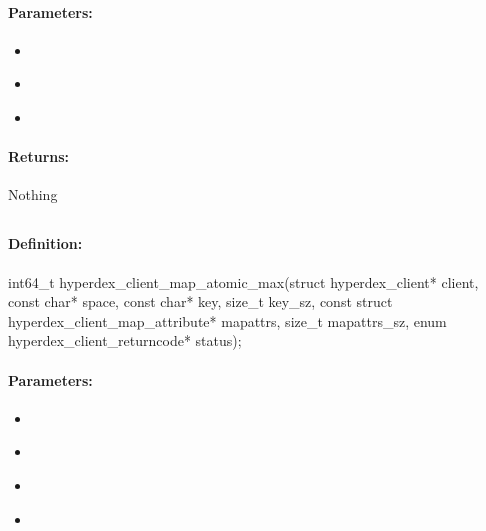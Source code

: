 \paragraph{Parameters:}
\begin{itemize}[noitemsep]
\item {}\\

\item {}\\

\item {}\\

\end{itemize}

\paragraph{Returns:}
Nothing
\pagebreak
\subsection{}
\label{api:c:map_atomic_max}


\paragraph{Definition:}
\begin{ccode}
int64_t hyperdex_client_map_atomic_max(struct hyperdex_client* client,
        const char* space,
        const char* key, size_t key_sz,
        const struct hyperdex_client_map_attribute* mapattrs, size_t mapattrs_sz,
        enum hyperdex_client_returncode* status);
\end{ccode}

\paragraph{Parameters:}
\begin{itemize}[noitemsep]
\item {}\\

\item {}\\

\item {}\\

\item {}\\

\end{itemize}

